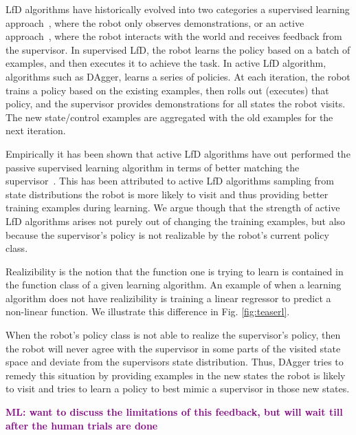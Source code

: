 \documentclass[10pt, conference]{ieeeconf}      %
\newcommand{\mlnote}[1]{\ifthenelse{ \boolean{include-notes}}%
 {\textcolor{purple}{\textbf{ML: #1}}}{}}
\begin{document}
LfD algorithms have historically evolved into two categories a supervised learning approach~\cite{pomerleau1989alvinn}, where the robot only observes demonstrations, or an active approach~\cite{ross2010reduction}, where the robot interacts with the world and receives feedback from the supervisor. In supervised LfD, the robot learns the policy based on a batch of examples, and then executes it to achieve the task.  In active LfD algorithm, algorithms such as DAgger, learns a series of policies. At each iteration, the robot trains a policy based on the existing examples, then rolls out (executes) that policy, and the supervisor provides demonstrations for all states the robot visits. The new state/control examples are aggregated with the old examples for the next iteration. 


Empirically it has been shown that active LfD algorithms have out performed the passive supervised learning algorithm in terms of better matching the supervisor~\cite{ross2010efficient,ross2010reduction,ross2013learning}. This has been attributed to active LfD algorithms sampling from state distributions the robot is more likely to visit and thus providing better training examples during learning.  We argue though  that the strength of active LfD algorithms arises not purely out of changing the training examples, but also because the supervisor's policy is not realizable by the  robot's current policy class. 

Realizibility is the notion that the function one is trying to learn is contained in the function class of a given learning algorithm. An example of when a learning algorithm does not have realizibility is training a linear regressor to predict a non-linear function. We illustrate this difference in Fig. \ref{fig:teaserl}.

When the robot's policy class is not able to realize the supervisor's policy, then the robot will never agree with the supervisor in some parts of the visited state space and deviate from the supervisors state distribution. Thus, DAgger tries to remedy this situation by providing examples in the new states the robot is likely to visit and tries to learn a policy to best mimic a supervisor in those new states. 

\mlnote{want to discuss the limitations of this feedback, but will wait till after the human trials are done}
\end{document}
